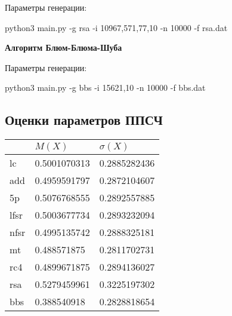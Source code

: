 \documentclass[spec, och, labwork]{shiza}
\begin{document}
 Параметры генерации:

  python3 main.py -g rsa -i 10967,571,77,10 -n 10000 -f rsa.dat
 \vspace{5mm}

 \textbf{Алгоритм Блюм-Блюма-Шуба}

  Параметры генерации:
 
  python3 main.py -g bbs -i 15621,10 -n 10000 -f bbs.dat

  

\subsection{Оценки параметров ППСЧ}
\begin{flushleft}
  \centering
  \begin{tabular}[t]{|p{1cm}|p{5cm}|p{5cm}|} \hline 
      	  & $M(X)$ & $\sigma (X)$ \\[2mm]\hline
    lc	  & 0.5001070313       &  0.2885282436     \\[2mm]\hline
    add   & 0.4959591797	     &  0.2872104607    \\[2mm]\hline
    5p    & 0.5076768555	     &  0.2892557885    \\[2mm]\hline
    lfsr  & 0.5003677734	     &  0.2893232094    \\[2mm]\hline
    nfsr  & 0.4995135742	     &  0.2888325181    \\[2mm]\hline
    mt    & 0.488571875	       &  0.2811702731    \\[2mm]\hline
    rc4   & 0.4899671875	     &  0.2894136027    \\[2mm]\hline
    rsa   & 0.5279459961	     &  0.3225197302    \\[2mm]\hline
    bbs   & 0.388540918	       &  0.2828818654    \\[2mm]\hline
  
\end{tabular}
\end{flushleft}
\end{document}
